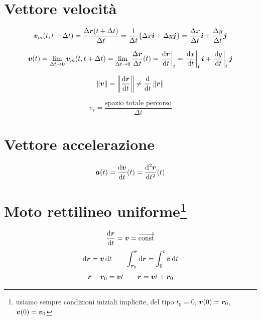 \section{Vettore velocità}
\begin{Def}
$$\boldsymbol{v}_m(t,t+\Delta t)=\frac{\Delta\boldsymbol{r}(t+\Delta t)}{\Delta
t}=\frac{1}{\Delta t}\{\Delta x\boldsymbol{i}+\Delta y\boldsymbol{j}\}=\frac{\Delta x}{\Delta t}\boldsymbol{i}+\frac{\Delta y}{\Delta t}\boldsymbol{j}$$
\end{Def}
\begin{Def}
\begin{equation*}\boldsymbol{v}(t)=\lim_{\Delta t\rightarrow 0}\boldsymbol{v}_m(t,t+\Delta t)=\lim_{\Delta t\rightarrow 0} \frac{\Delta\boldsymbol{r}}{\Delta t}(t)={\left.\frac{\mathrm{d} \boldsymbol{r}}{\mathrm{d} t}\right|_t}=\left.\frac{\mathrm{d} x}{\mathrm{d} t}\right|_t\boldsymbol{i}+\left.\frac{\mathrm{d} y}{\mathrm{d} t}\right|_t\boldsymbol{j}\end{equation*}
\end{Def}
\begin{equation*}\left\lVert\boldsymbol{v}\right\rVert=\left\lVert\frac{\mathrm{d}\boldsymbol{r}}{\mathrm{d} t}\right\rVert\neq\frac{\mathrm{d}}{\mathrm{d} t}\left\lVert\boldsymbol{r}\right\rVert\end{equation*}
\begin{Def}
\begin{equation*}v_s=\frac{\text{spazio totale percorso}}{\Delta t}\end{equation*}
\end{Def}
\section{Vettore accelerazione}
\begin{Def}
\begin{equation*}\boldsymbol{a}(t)=\frac{\mathrm{d} \boldsymbol{v}}{\mathrm{d} t}(t)={\frac{\mathrm{d}^2 \boldsymbol{r}}{\mathrm{d} t^2}}(t)\end{equation*}
\end{Def}
\section[Moto rettilineo uniforme]{Moto rettilineo uniforme\protect\footnote{usiamo sempre condizioni iniziali implicite, del tipo $t_0=0$, $\boldsymbol{r}(0)=\boldsymbol{r}_0$, $\boldsymbol{v}(0)=\boldsymbol{v}_0$}}
\begin{equation*}\frac{\mathrm{d}\boldsymbol{r}}{\mathrm{d} t}=\boldsymbol{v}=\overrightarrow{\text{const}}\end{equation*}
\begin{equation*}\mathrm{d}\boldsymbol{r}=\boldsymbol{v}\,\mathrm{d} t\qquad\int_{\boldsymbol{r}_0}^{\boldsymbol{r}}\mathrm{d}\boldsymbol{r}=\int_0^t\boldsymbol{v}\,\mathrm{d} t\end{equation*}
\begin{equation*}\boldsymbol{r}-\boldsymbol{r}_0=\boldsymbol{v} t\qquad\boldsymbol{r}=\boldsymbol{v} t+\boldsymbol{r}_0\end{equation*}
